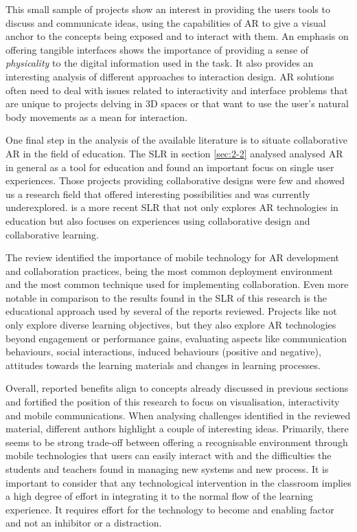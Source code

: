 This small sample of projects show an interest in providing the users tools to discuss and communicate ideas, using the capabilities of AR to give a visual anchor to the concepts being
exposed and to interact with them. An emphasis on offering tangible interfaces shows the importance of providing a sense of \emph{physicality} to the digital information used in the task.
It also provides an interesting analysis of different approaches to interaction design. \ac{AR} solutions often need to deal with issues related to interactivity and interface problems that
are unique to projects delving in 3D spaces or that want to use the user's natural body movements as a mean for interaction.

One final step in the analysis of the available literature is to situate collaborative \ac{AR} in the field of education. The \ac{SLR} in section \ref{sec:2-2} analysed analysed \ac{AR} in
general as a tool for education and found an important focus on single user experiences. Those projects providing collaborative designs were few and showed us a research field that offered
interesting possibilities and was currently underexplored. \textcite{upadhyay_2024} is a more recent \ac{SLR} that not only explores \ac{AR} technologies in education but also focuses on
experiences using collaborative design and collaborative learning.

The review identified the importance of mobile technology for \ac{AR} development and collaboration practices, being the most common deployment environment and the most common technique
used for implementing collaboration. Even more notable in comparison to the results found in the \ac{SLR} of this research is the educational approach used by several of the reports
reviewed. Projects like \textcite{schiffeler_2019,radu_2023,vassigh_2020,auer_2019} not only explore diverse learning objectives, but they also explore \ac{AR} technologies beyond
engagement or performance gains, evaluating aspects like communication behaviours, social interactions, induced behaviours (positive and negative), attitudes towards the learning materials
and changes in learning processes.

Overall, reported benefits align to concepts already discussed in previous sections and fortified the position of this research to focus on visualisation, interactivity and mobile
communications. When analysing challenges identified in the reviewed material, different authors highlight a couple of interesting ideas. Primarily, there seems to be strong trade-off
between offering a recognisable environment through mobile technologies that users can easily interact with and the difficulties the students and teachers found in managing new systems and
new process. It is important to consider that any technological intervention in the classroom implies a high degree of effort in integrating it to the normal flow of the learning experience.
It requires effort for the technology to become and enabling factor and not an inhibitor or a distraction.

